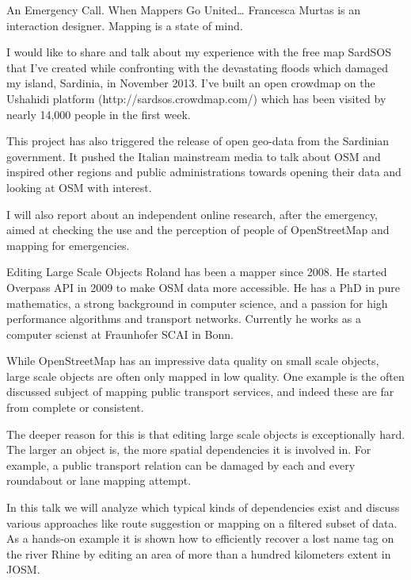 %
{An Emergency Call. When Mappers Go United\dots}%
{Francesca Murtas is an interaction designer. Mapping is a state of mind.}%
{I would like to share and talk about my experience with the free map SardSOS that I've created while confronting with the devastating floods which damaged my island, Sardinia, in November 2013. I've built an open crowdmap on the Ushahidi platform (http://sardsos.crowdmap.com/) which has been visited by nearly 14,000 people in the first week.

This project has also triggered the release of open geo-data from the Sardinian government. It pushed the Italian mainstream media to talk about OSM and inspired other regions and public administrations towards opening their data and looking at OSM with interest.

I will also report about an independent online research, after the emergency, aimed at checking the use and the perception of people of OpenStreetMap and mapping for emergencies.}

%
{Editing Large Scale Objects}%
{Roland has been a mapper since 2008. He started Overpass API in 2009 to make OSM data more accessible. He has a PhD in pure mathematics, a strong background in computer science, and a passion for high performance algorithms and transport networks. Currently he works as a computer scienst at Fraunhofer SCAI in Bonn. }%
{While OpenStreetMap has an impressive data quality on small scale objects, large scale objects are often only mapped in low quality. One example is the often discussed subject of mapping public transport services, and indeed these are far from complete or consistent.

The deeper reason for this is that editing large scale objects is exceptionally hard. The larger an object is, the more spatial dependencies it is involved in. For example, a public transport relation can be damaged by each and every roundabout or lane mapping attempt.

In this talk we will analyze which typical kinds of dependencies exist and discuss various approaches like route suggestion or mapping on a filtered subset of data. As a hands-on example it is shown how to efficiently recover a lost name tag on the river Rhine by editing an area of more than a hundred kilometers extent in JOSM.}

